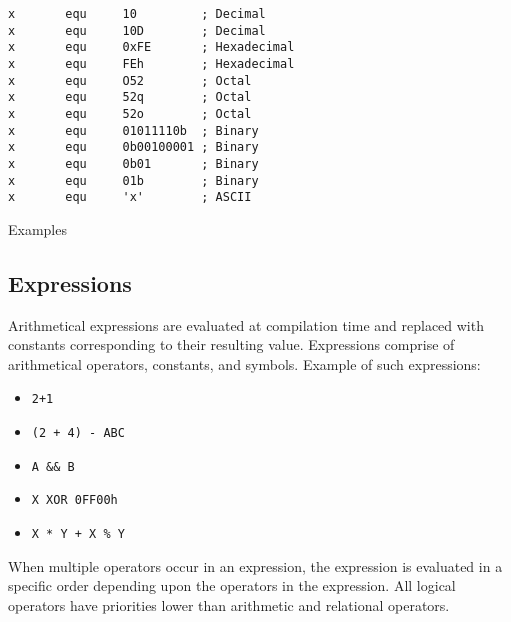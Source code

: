         \begin{code}[h!]
        {
            \usecodefont

            \verb'x       equ     10         ; Decimal'\\
            \verb'x       equ     10D        ; Decimal'\\
            \verb'x       equ     0xFE       ; Hexadecimal'\\
            \verb'x       equ     FEh        ; Hexadecimal'\\
            \verb'x       equ     O52        ; Octal'\\
            \verb'x       equ     52q        ; Octal'\\
            \verb'x       equ     52o        ; Octal'\\
            \verb'x       equ     01011110b  ; Binary'\\
            \verb'x       equ     0b00100001 ; Binary'\\
            \verb'x       equ     0b01       ; Binary'\\
            \verb'x       equ     01b        ; Binary'\\
            \verb"x       equ     'x'        ; ASCII"

            \caption{Examples}
            \label{code:svcb}
        }
        \end{code}

    \subsection{Expressions}
        Arithmetical expressions are evaluated at compilation time and replaced with constants corresponding to their resulting value. Expressions comprise of arithmetical operators, constants, and symbols. Example of such expressions:

        \begin{itemize}
            \item \texttt{2+1}
            \item \texttt{(2 + 4) - ABC}
            \item \texttt{A \&\& B}
            \item \texttt{X XOR 0FF00h}
            \item \texttt{X * Y + X \% Y}
        \end{itemize}

        When multiple operators occur in an expression, the expression is evaluated in a specific order depending upon the operators in the expression. All logical operators have priorities lower than arithmetic and relational operators.

